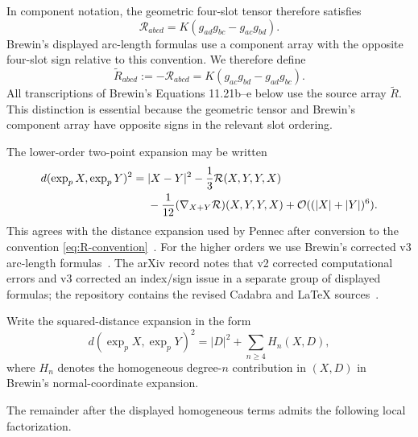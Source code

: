 \documentclass[11pt]{amsart}
\numberwithin{equation}{section}
\theoremstyle{remark}
\newcommand{\Riem}{\mathcal{R}}
\newcommand{\BRiem}{\widetilde{R}}
\newcommand{\bigO}{\mathcal{O}}
\begin{document}
In component notation, the geometric four-slot tensor therefore satisfies
\begin{equation}\label{eq:R-components}
 \Riem_{abcd}
 =K\left(g_{ad}g_{bc}-g_{ac}g_{bd}\right).
\end{equation}
Brewin's displayed arc-length formulas use a component array with the
opposite four-slot sign relative to this convention.  We therefore define
\begin{equation}\label{eq:brewin-array}
 \BRiem_{abcd}
 :=-\Riem_{abcd}
 =K\left(g_{ac}g_{bd}-g_{ad}g_{bc}\right).
\end{equation}
All transcriptions of Brewin's Equations 11.21b--e below use the source
array $\BRiem$.  This distinction is essential because the geometric tensor
and Brewin's component array have opposite signs in the relevant slot
ordering.

The lower-order two-point expansion may be written
\begin{align}
 d(\exp_pX,\exp_pY)^2
={}&|X-Y|^2-\frac13\Riem(X,Y,Y,X)\notag\\
&-\frac1{12}(\nabla_{X+Y}\Riem)(X,Y,Y,X)
+\bigO((|X|+|Y|)^6).
\label{eq:lower-distance}
\end{align}
This agrees with the distance expansion used by Pennec after conversion to the convention \eqref{eq:R-convention}~\cite[Eq.~(9)]{Pennec2019}.  For the higher orders we use Brewin's corrected v3 arc-length formulas~\cite{Brewin2009}.  The arXiv record notes that v2 corrected computational errors and v3 corrected an index/sign issue in a separate group of displayed formulas; the repository contains the revised Cadabra and LaTeX sources~\cite{BrewinRepository}.

Write the squared-distance expansion in the form
\begin{equation}\label{eq:Hn-definition}
d(\exp_pX,\exp_pY)^2=|D|^2+\sum_{n\ge4}H_n(X,D),
\end{equation}
where $H_n$ denotes the homogeneous degree-$n$ contribution in $(X,D)$ in Brewin's normal-coordinate expansion.

  The remainder after the displayed homogeneous terms admits the following local factorization.
\end{document}
